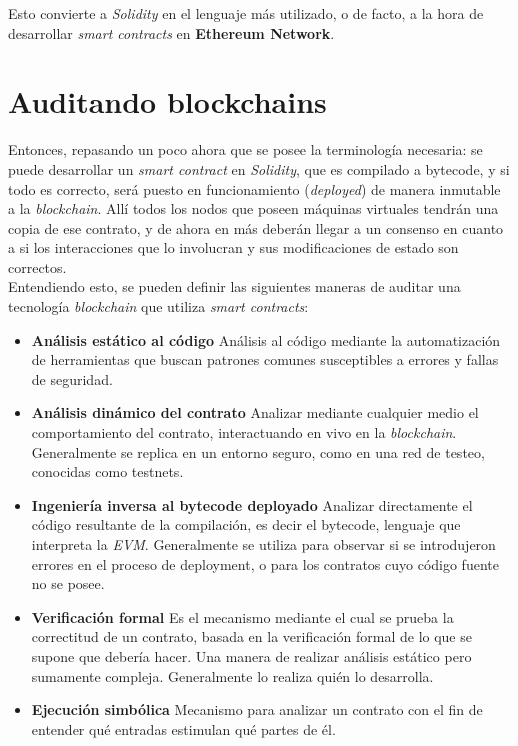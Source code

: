 Esto convierte a \textit{Solidity} en el lenguaje más utilizado, o de facto, a la hora de desarrollar \textit{smart contracts} en \textbf{Ethereum Network}\cite{ethereumhowlink}.

\section{Auditando blockchains}
\label{sect:marco:auditblock}
Entonces, repasando un poco ahora que se posee la terminología necesaria: se puede desarrollar un \textit{smart contract} en \textit{Solidity}, que es compilado a bytecode, y si todo es correcto, será puesto en funcionamiento (\textit{deployed}) de manera inmutable a la \textit{blockchain}. Allí todos los nodos que poseen máquinas virtuales tendrán una copia de ese contrato, y de ahora en más deberán llegar a un consenso en cuanto a si los interacciones que lo involucran y sus modificaciones de estado son correctos.\\

Entendiendo esto, se pueden definir las siguientes maneras de auditar una tecnología \textit{blockchain} que utiliza \textit{smart contracts}:
\begin{itemize}
    \item \textbf{Análisis estático al código}\newline
    Análisis al código mediante la automatización de herramientas que buscan patrones comunes susceptibles a errores y fallas de seguridad.
    \item \textbf{Análisis dinámico del contrato}\newline
    Analizar mediante cualquier medio el comportamiento del contrato, interactuando en vivo en la \textit{blockchain}. Generalmente se replica en un entorno seguro, como en una red de testeo, conocidas como testnets.
    \item \textbf{Ingeniería inversa al bytecode deployado}\newline
    Analizar directamente el código resultante de la compilación, es decir el bytecode, lenguaje que interpreta la \textit{EVM}. Generalmente se utiliza para observar si se introdujeron errores en el proceso de deployment, o para los contratos cuyo código fuente no se posee.
    \item \textbf{Verificación formal}\newline
    Es el mecanismo mediante el cual se prueba la correctitud de un contrato, basada en la verificación formal de lo que se supone que debería hacer. Una manera de realizar análisis estático pero sumamente compleja. Generalmente lo realiza quién lo desarrolla.
    \item \textbf{Ejecución simbólica}\newline
    Mecanismo para analizar un contrato con el fin de entender qué entradas estimulan qué partes de él.
\end{itemize}

